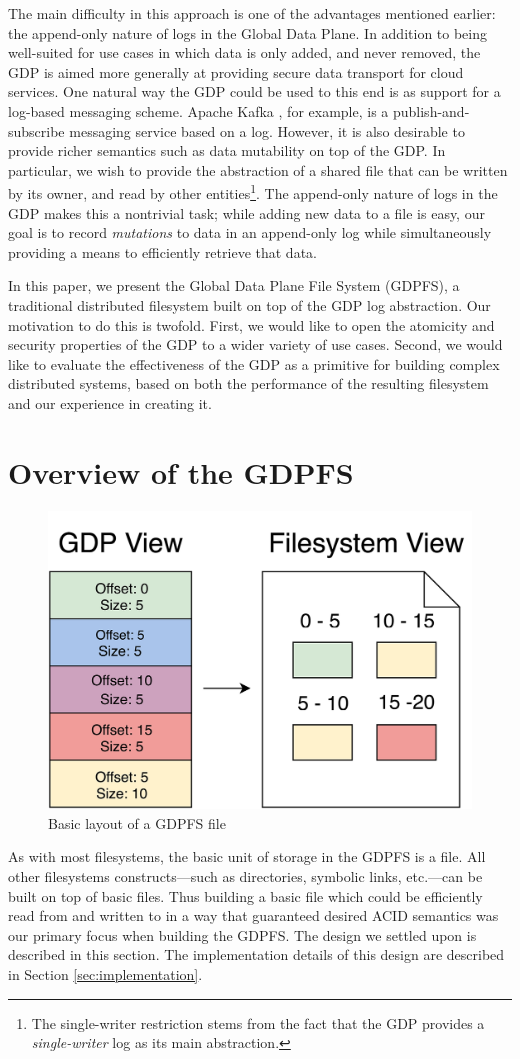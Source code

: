 \documentclass{acm_proc_article-sp}
\begin{document}
The main difficulty in this approach is one of the advantages mentioned earlier: the append-only nature of logs in the Global Data Plane. In addition to being well-suited for use cases in which data is only added, and never removed, the GDP is aimed more generally at providing secure data transport for cloud services. One natural way the GDP could be used to this end is as support for a log-based messaging scheme. Apache Kafka \cite{Kafka}, for example, is a publish-and-subscribe messaging service based on a log. However, it is also desirable to provide richer semantics such as data mutability on top of the GDP. In particular, we wish to provide the abstraction of a shared file that can be written by its owner, and read by other entities\footnote{The single-writer restriction stems from the fact that the GDP provides a \emph{single-writer} log as its main abstraction.}. The append-only nature of logs in the GDP makes this a nontrivial task; while adding new data to a file is easy, our goal is to record \emph{mutations} to data in an append-only log while simultaneously providing a means to efficiently retrieve that data.

In this paper, we present the Global Data Plane File System (GDPFS), a traditional distributed filesystem built on top of the GDP log abstraction. Our motivation to do this is twofold. First, we would like to open the atomicity and security properties of the GDP to a wider variety of use cases. Second, we would like to evaluate the effectiveness of the GDP as a primitive for building complex distributed systems, based on both the performance of the resulting filesystem and our experience in creating it.

\section{Overview of the GDPFS}
\begin{figure}[t]
\centering
\includegraphics[width=.6\columnwidth]{gdpfs_basic_file}
\caption{Basic layout of a GDPFS file\label{fig:gdpfs_basic_file}}
\end{figure}
As with most filesystems, the basic unit of storage in the GDPFS is a file. All other filesystems constructs---such as directories, symbolic links, etc.---can be built on top of basic files. Thus building a basic file which could be efficiently read from and written to in a way that guaranteed desired ACID semantics was our primary focus when building the GDPFS. The design we settled upon is described in this section. The implementation details of this design are described in Section \ref{sec:implementation}.
\end{document}
